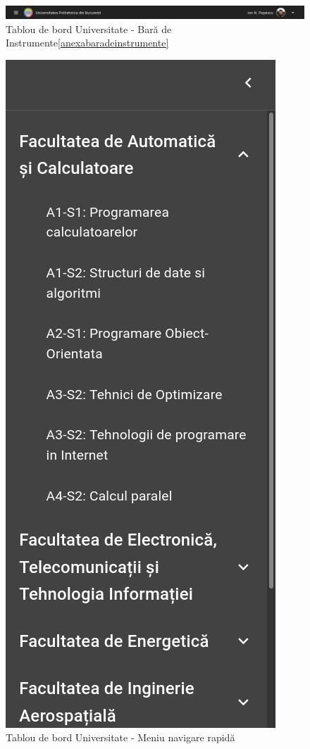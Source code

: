\documentclass[12pt, a4paper, oneside, romanian]{teza-upb}
\begin{document}
\begin{figure}[H]
\centering
\includegraphics*[width=\columnwidth]{tablou-de-bord-universitate-bara-de-instrumente}
\caption{Tablou de bord Universitate - Bară de Instrumente\ref{anexabaradeinstrumente}}
\label{tablou-de-bord-universitate-bara-de-instrumente}
\end{figure}

\begin{figure}[H]
\centering
\includegraphics*[width=0.4\columnwidth]{tablou-de-bord-universitate-meniu-navigare-rapida}
\caption{Tablou de bord Universitate - Meniu navigare rapidă}
\label{tablou-de-bord-universitate-meniu-navigare-rapida}
\end{figure}
\end{document}

